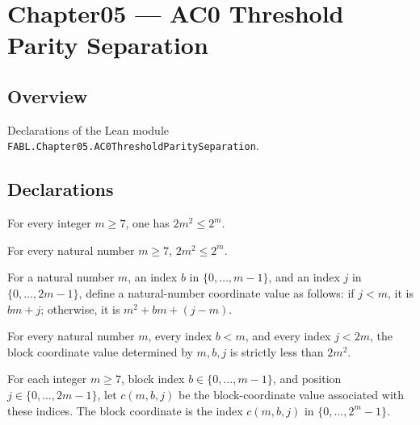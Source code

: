 \chapter{Chapter05 — AC0 Threshold Parity Separation}
\section{Overview}

Declarations of the Lean module \texttt{FABL.Chapter05.AC0ThresholdParitySeparation}.

\section{Declarations}

\begin{theorem}
\label{FABL.two_mul_sq_le_two_pow_of_seven_le}
\leanok
{}
For every integer $m\ge 7$, one has $2m^2\le 2^m$.
\end{theorem}

\begin{theorem}
\label{FABL.activeCoordinateCount_le_dimension}
\leanok
{}
For every natural number $m\ge 7$, $2m^2\le 2^m$.
\end{theorem}

\begin{definition}
\label{FABL.blockCoordinateValue}
\leanok
For a natural number $m$, an index $b$ in $\{0,\ldots,m-1\}$, and an index $j$ in
$\{0,\ldots,2m-1\}$, define a natural-number coordinate value as follows: if $j<m$, it
is $bm+j$; otherwise, it is $m^2+bm+(j-m)$.
\end{definition}

\begin{theorem}
\label{FABL.blockCoordinateValue_lt_active}
\leanok
{}
For every natural number $m$, every index $b<m$, and every index $j<2m$, the block
coordinate value determined by $m,b,j$ is strictly less than $2m^2$.
\end{theorem}

\begin{definition}
\label{FABL.blockCoordinate}
\leanok
{}
For each integer $m \ge 7$, block index $b \in \{0,\ldots,m-1\}$, and position $j \in
\{0,\ldots,2m-1\}$, let $c(m,b,j)$ be the block-coordinate value associated with these
indices. The block coordinate is the index $c(m,b,j)$ in $\{0,\ldots,2^m-1\}$.
\end{definition}

